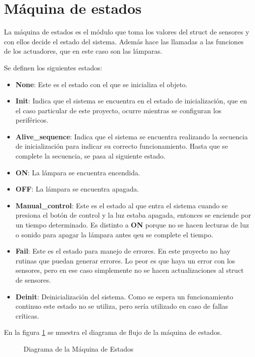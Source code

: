 \section{Máquina de estados}

La máquina de estados es el módulo que toma los valores del struct de sensores y con ellos decide el
estado del sistema. Además hace las llamadas a las funciones de los actuadores, que en este caso son
las lámparas. 

Se definen los siguientes estados:

\begin{itemize}
\item \textbf{None}: Este es el estado con el que se inicializa el objeto. 
\item \textbf{Init}: Indica que el sistema se encuentra en el estado de inicialización, que en el
  caso particular de este proyecto, ocurre mientras se configuran los periféricos.
\item \textbf{Alive\_sequence}: Indica que el sistema se encuentra realizando la secuencia de
  inicialización para indicar su correcto funcionamiento. Hasta que se complete la secuencia, se
  pasa al siguiente estado. 
\item \textbf{ON}: La lámpara se encuentra encendida.
\item \textbf{OFF}: La lámpara se encuentra apagada.
\item \textbf{Manual\_control}: Este es el estado al que entra el sistema cuando se presiona el
  botón de control y la luz estaba apagada, entonces se enciende por un tiempo determinado. Es
  distinto a \textbf{ON} porque no se hacen lecturas de luz o sonido para apagar la lámpara antes
  qeu se complete el tiempo.
\item \textbf{Fail}: Este es el estado para manejo de errores. En este proyecto no hay rutinas que
  puedan generar errores. Lo peor es que haya un error con los sensores, pero en ese caso simplemente
  no se hacen actualizaciones al struct de sensores. 
\item \textbf{Deinit}: Deinicialización del sistema. Como se espera un funcionamiento continuo este
  estado no se utiliza, pero sería utilizado en caso de fallas críticas. 
\end{itemize}

En la figura \ref{fig:state_machine} se muestra el diagrama de flujo de la máquina de estados. 

\begin{figure}
\centering
\scalebox{.4}{}
\caption{Diagrama de la Máquina de Estados}
\label{fig:state_machine}
\end{figure}




